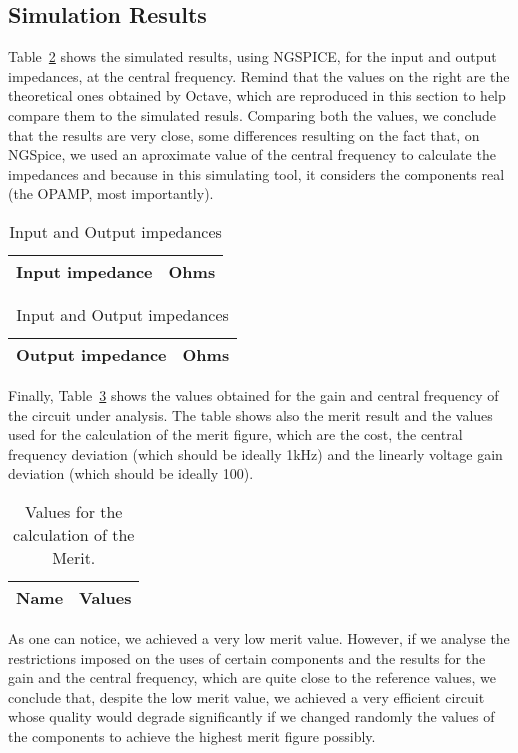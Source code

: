 \subsection{Simulation Results}

Table~\ref{tab1:impedance} shows the simulated results, using NGSPICE, for the input and output impedances, at the central frequency. Remind that the values on the right are the theoretical ones obtained by Octave, which are reproduced in this section to help compare them to the simulated resuls. Comparing both the values, we conclude that the results are very close, some differences resulting on the fact that, on NGSpice, we used an aproximate value of the central frequency to calculate the impedances and because in this simulating tool, it considers the components real (the OPAMP, most importantly).


\begin{table}[H]
  \centering
  \begin{tabular}{|l|r|}
    \hline    
    {\bf Input impedance} & {\bf Ohms} \\ \hline
    
  \end{tabular}
  \begin{tabular}{|l|r|}
    \hline    
    {\bf Output impedance} & {\bf Ohms} \\ \hline
    
  \end{tabular}
  \caption{Input and Output impedances}
  \label{tab1:impedance}
\end{table}

Finally, Table~\ref{tab:merit} shows the values obtained for the gain and central frequency of the circuit under analysis. The table shows also the merit result and the values used for the calculation of the merit figure, which are the cost, the central frequency deviation (which should be ideally 1kHz) and the linearly voltage gain deviation (which should be ideally 100).

\begin{table}[H]
  \centering
  \begin{tabular}{|l|r|}
    \hline    
    {\bf Name} & {\bf Values} \\ \hline
    
  \end{tabular}
  \caption{Values for the calculation of the Merit.}
  \label{tab:merit}
\end{table}

As one can notice, we achieved a very low merit value. However, if we analyse the restrictions imposed on the uses of certain components and the results for the gain and the central frequency, which are quite close to the reference values, we conclude that, despite the low merit value, we achieved a very efficient circuit whose quality would degrade significantly if we changed randomly the values of the components to achieve the highest merit figure possibly.


